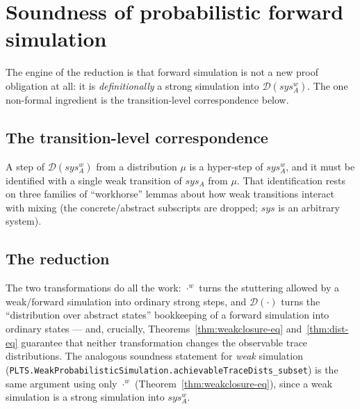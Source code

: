 

\section{Soundness of probabilistic forward simulation}

The engine of the reduction is that forward simulation is not a new proof
obligation at all: it is \emph{definitionally} a strong simulation into
$\mathcal{D}(sys_A^w)$. The one non-formal ingredient is the transition-level
correspondence below.

\subsection{The transition-level correspondence}

A step of $\mathcal{D}(sys_A^w)$ from a distribution $\mu$ is a hyper-step of
$sys_A^w$, and it must be identified with a single weak transition of $sys_A$ from
$\mu$. That identification rests on three families of ``workhorse'' lemmas about
how weak transitions interact with mixing (the concrete/abstract subscripts are
dropped; $sys$ is an arbitrary system).









\subsection{The reduction}





The two transformations do all the work: $\cdot^w$ turns the stuttering allowed by
a weak/forward simulation into ordinary strong steps, and $\mathcal{D}(\cdot)$
turns the ``distribution over abstract states'' bookkeeping of a forward
simulation into ordinary states --- and, crucially,
Theorems~\ref{thm:weakclosure-eq} and~\ref{thm:dist-eq} guarantee that neither
transformation changes the observable trace distributions. The analogous soundness
statement for \emph{weak} simulation
(\texttt{PLTS.WeakProbabilisticSimulation.achievableTraceDists\_subset}) is the same
argument using only $\cdot^w$ (Theorem~\ref{thm:weakclosure-eq}), since a weak
simulation is a strong simulation into $sys_A^w$.

